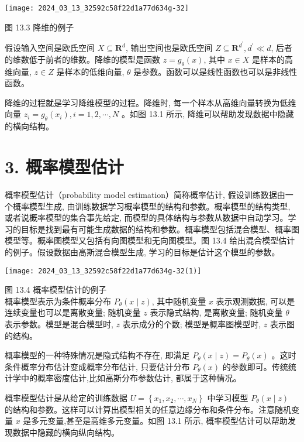 \documentclass[10pt]{article}
\begin{document}
\begin{CJK*}{UTF8}{bsmi}
\begin{center}
\texttt{[image: 2024\_03\_13\_32592c58f22d1a77d634g-32]}
\end{center}

图 13.3 降维的例子

假设输入空间是欧氏空间 $X \subseteq \boldsymbol{R}^{d}$, 输出空间也是欧氏空间 $Z \subseteq \boldsymbol{R}^{d^{\prime}}, d^{\prime} \ll d$, 后者的维数低于前者的维数。降维的模型是函数 $z=g_{\theta}(x)$, 其中 $x \in X$ 是样本的高维向量, $z \in Z$ 是样本的低维向量, $\theta$ 是参数。函数可以是线性函数也可以是非线性函数。

降维的过程就是学习降维模型的过程。降维时, 每一个样本从高维向量转换为低维向量 $z_{i}=g_{\theta}\left(x_{i}\right), i=1,2, \cdots, N$ 。如图 13.1 所示, 降维可以帮助发现数据中隐藏的横向结构。

\section*{3. 概率模型估计}
概率模型估计（probability model estimation）简称概率估计, 假设训练数据由一个概率模型生成, 由训练数据学习概率模型的结构和参数。概率模型的结构类型, 或者说概率模型的集合事先给定, 而模型的具体结构与参数从数据中自动学习。学习的目标是找到最有可能生成数据的结构和参数。概率模型包括混合模型、概率图模型等。概率图模型又包括有向图模型和无向图模型。图 13.4 给出混合模型估计的例子。假设数据由高斯混合模型生成, 学习的目标是估计这个模型的参数。

\begin{center}
\texttt{[image: 2024\_03\_13\_32592c58f22d1a77d634g-32(1)]}
\end{center}

图 13.4 概率模型估计的例子\\
概率模型表示为条件概率分布 $P_{\theta}(x \mid z)$, 其中随机变量 $x$ 表示观测数据, 可以是连续变量也可以是离散变量; 随机变量 $z$ 表示隐式结构, 是离散变量; 随机变量 $\theta$ 表示参数。模型是混合模型时, $z$ 表示成分的个数; 模型是概率图模型时, $z$ 表示图的结构。

概率模型的一种特殊情况是隐式结构不存在, 即满足 $P_{\theta}(x \mid z)=P_{\theta}(x)$ 。这时条件概率分布估计变成概率分布估计, 只要估计分布 $P_{\theta}(x)$ 的参数即可。传统统计学中的概率密度估计,比如高斯分布参数估计, 都属于这种情况。

概率模型估计是从给定的训练数据 $U=\left\{x_{1}, x_{2}, \cdots, x_{N}\right\}$ 中学习模型 $P_{\theta}(x \mid z)$ 的结构和参数。这样可以计算出模型相关的任意边缘分布和条件分布。注意随机变量 $x$ 是多元变量,甚至是高维多元变量。如图 13.1 所示, 概率模型估计可以帮助发现数据中隐藏的横向纵向结构。


\end{CJK*}
\end{document}
